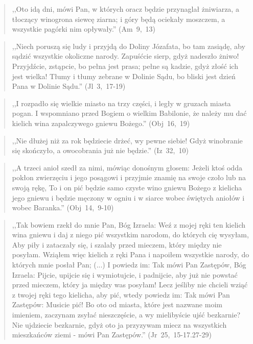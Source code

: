 \documentclass[10pt,a4paper,oneside]{article}
\begin{document}
\begin{quote}
,,Oto idą dni, mówi Pan, w których oracz będzie przynaglał żniwiarza, a tłoczący winogrona siewcę ziarna; i góry będą ociekały moszczem, a wszystkie pagórki nim opływały.'' \mbox{(Am 9, 13)}
\end{quote}
\begin{quote}
,,Niech poruszą się ludy i przyjdą do Doliny Józafata, bo tam zasiądę, aby sądzić wszystkie okoliczne narody. Zapuśćcie sierp, gdyż nadeszło żniwo! Przyjdźcie, zstąpcie, bo pełna jest prasa; pełne są kadzie, gdyż złość ich jest wielka! Tłumy i tłumy zebrane w Dolinie Sądu, bo bliski jest dzień Pana w Dolinie Sądu.'' \mbox{(Jl 3, 17-19)}
\end{quote}
\begin{quote}
,,I rozpadło się wielkie miasto na trzy części, i legły w gruzach miasta pogan. I wspomniano przed Bogiem o wielkim Babilonie, że należy mu dać kielich wina zapalczywego gniewu Bożego.'' \mbox{(Obj 16, 19)}
\end{quote}
\begin{quote}
,,Nie dłużej niż za rok będziecie drżeć, wy pewne siebie! Gdyż winobranie się skończyło, a owocobrania już nie będzie.'' \mbox{(Iz 32, 10)}
\end{quote}
\begin{quote}
,,A trzeci anioł szedł za nimi, mówiąc donośnym głosem: Jeżeli ktoś odda pokłon zwierzęciu i jego posągowi i przyjmie znamię na swoje czoło lub na swoją rękę, To i on pić będzie samo czyste wino gniewu Bożego z kielicha jego gniewu i będzie męczony w ogniu i w siarce wobec świętych aniołów i wobec Baranka.'' \mbox{(Obj 14, 9-10)}
\end{quote}
\begin{quote}
,,Tak bowiem rzekł do mnie Pan, Bóg Izraela: Weź z mojej ręki ten kielich wina gniewu i daj z niego pić wszystkim narodom, do których cię wysyłam, Aby piły i zataczały się, i szalały przed mieczem, który między nie posyłam. Wziąłem więc kielich z ręki Pana i napoiłem wszystkie narody, do których mnie posłał Pan; (...) I powiedz im: Tak mówi Pan Zastępów, Bóg Izraela: Pijcie, upijcie się i wymiotujcie, i padnijcie, aby już nie powstać przed mieczem, który ja między was posyłam! Lecz jeśliby nie chcieli wziąć z twojej ręki tego kielicha, aby pić, wtedy powiedz im: Tak mówi Pan Zastępów: Musicie pić! Bo oto od miasta, które jest nazwane moim imieniem, zaczynam zsyłać nieszczęście, a wy mielibyście ujść bezkarnie? Nie ujdziecie bezkarnie, gdyż oto ja przyzywam miecz na wszystkich mieszkańców ziemi - mówi Pan Zastępów.'' \mbox{(Jr 25, 15-17.27-29)}
\end{quote}
\end{document}
